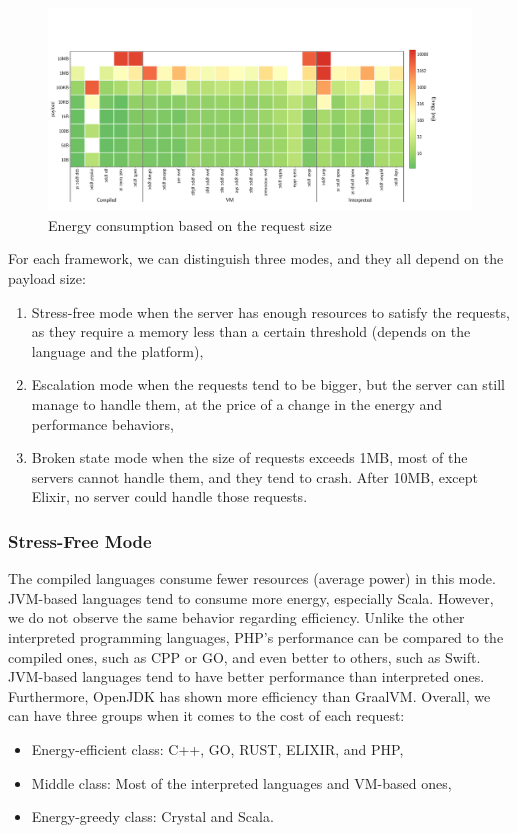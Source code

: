 \begin{figure}[!hbt]
    \begin{center}
        \includegraphics[width=1.2\linewidth]{imgs/energy_cost_payload}
    \end{center}
    \caption{Energy consumption based on the request size}\label{fig:energy_cost_payload}
\end{figure}

For each framework, we can distinguish three modes, and they all depend on the payload size:
\begin{enumerate}
    \item \textsf{Stress-free} mode when the server has enough resources to satisfy the requests, as they require a memory less than a certain threshold (depends on the language and the platform),
    \item \textsf{Escalation} mode when the requests tend to be bigger, but the server can still manage to handle them, at the price of a change in the energy and performance behaviors,
    \item \textsf{Broken state} mode when the size of requests exceeds 1MB, most of the servers cannot handle them, and they tend to crash. After 10MB, except Elixir, no server could handle those requests.
\end{enumerate}


\subsubsection{Stress-Free Mode}
The compiled languages consume fewer resources (average power) in this mode.
JVM-based languages tend to consume more energy, especially Scala.
However, we do not observe the same behavior regarding efficiency.
Unlike the other interpreted programming languages, PHP's performance can be compared to the compiled ones, such as CPP or GO, and even better to others, such as Swift.
JVM-based languages tend to have better performance than interpreted ones.
Furthermore, OpenJDK has shown more efficiency than GraalVM.
Overall, we can have three groups when it comes to the cost of each request:
\begin{itemize}
    \item Energy-efficient class: C++, GO, RUST, ELIXIR, and PHP,
    \item Middle class: Most of the interpreted languages and VM-based ones,
    \item Energy-greedy class: Crystal and Scala.
\end{itemize}

